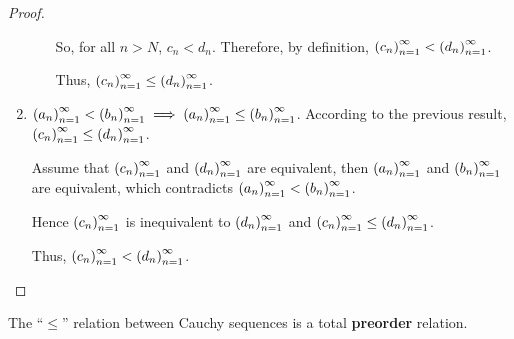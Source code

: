\begin{proof}
\begin{enumerate}[label={(\roman*)}]
\begin{enumerate}[label={\textbf{Case \arabic*.}}]
                        So, for all $n > N$, $c_{n} < d_{n}$. Therefore, by definition, $\seq{c_{n}} < \seq{d_{n}}$.
                        \bigskip

                        Thus, $\seq{c_{n}}\le\seq{d_{n}}$.
              \end{enumerate}
        \item $\seq{a_{n}} < \seq{b_{n}} \implies \seq{a_{n}}\le\seq{b_{n}}$. According to the previous result, $\seq{c_{n}}\le\seq{d_{n}}$.

              Assume that $\seq{c_{n}}$ and $\seq{d_{n}}$ are equivalent, then $\seq{a_{n}}$ and $\seq{b_{n}}$ are equivalent, which contradicts $\seq{a_{n}} < \seq{b_{n}}$.

              Hence $\seq{c_{n}}$ is inequivalent to $\seq{d_{n}}$ and $\seq{c_{n}}\le\seq{d_{n}}$.

              Thus, $\seq{c_{n}} < \seq{d_{n}}$.\qedhere
    \end{enumerate}
\end{proof}

\begin{theorem}\label{theorem:chapter1:preorder}
    The ``$\le$'' relation between Cauchy sequences is a total \textbf{preorder} relation.
\end{theorem}

